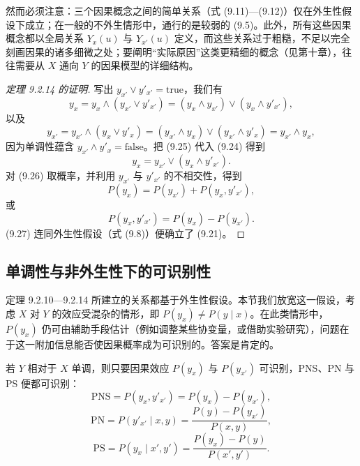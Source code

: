 然而必须注意：三个因果概念之间的简单关系（式 \textup{(9.11)}—\textup{(9.12)}）仅在外生性假设下成立；在一般的不外生情形中，通行的是较弱的 \textup{(9.5)}。此外，所有这些因果概念都以全局关系 $Y_x(u)$ 与 $Y_{x'}(u)$ 定义，而这些关系过于粗糙，不足以完全刻画因果的诸多细微之处；要阐明“实际原因”这类更精细的概念（见第十章），往往需要从 $X$ 通向 $Y$ 的因果模型的详细结构。

\begin{proof}[定理 9.2.14 的证明]
写出 $y_{x'}\vee y'_{x'}=\text{true}$，我们有
\begin{equation}
y_x=y_x\wedge(y_{x'}\vee y'_{x'})=(y_x\wedge y_{x'})\vee(y_x\wedge y'_{x'}), \tag{9.24}
\end{equation}
以及
\begin{equation}
y_{x'}=y_{x'}\wedge(y_x\vee y'_x)=(y_{x'}\wedge y_x)\vee(y_{x'}\wedge y'_x)=y_{x'}\wedge y_x, \tag{9.25}
\end{equation}
因为单调性蕴含 $y_{x'}\wedge y'_x=\text{false}$。把 \textup{(9.25)} 代入 \textup{(9.24)} 得到
\begin{equation}
y_x=y_{x'}\vee(y_x\wedge y'_{x'}). \tag{9.26}
\end{equation}
对 \textup{(9.26)} 取概率，并利用 $y_{x'}$ 与 $y'_{x'}$ 的不相交性，得到
\[
P(y_x)=P(y_{x'})+P(y_x,y'_{x'}),
\]
或
\begin{equation}
P(y_x,y'_{x'})=P(y_x)-P(y_{x'}). \tag{9.27}
\end{equation}
\textup{(9.27)} 连同外生性假设（式 \textup{(9.8)}）便确立了 \textup{(9.21)}。
\end{proof}

\subsection{单调性与非外生性下的可识别性}

定理 9.2.10—9.2.14 所建立的关系都基于外生性假设。本节我们放宽这一假设，考虑 $X$ 对 $Y$ 的效应受混杂的情形，即 $P(y_x)\ne P(y\mid x)$。在此类情形中，$P(y_x)$ 仍可由辅助手段估计（例如调整某些协变量，或借助实验研究），问题在于这一附加信息能否使因果概率成为可识别的。答案是肯定的。

\begin{theorem}
若 $Y$ 相对于 $X$ 单调，则只要因果效应 $P(y_x)$ 与 $P(y_{x'})$ 可识别，PNS、PN 与 PS 便都可识别：
\begin{equation}
\mathrm{PNS}=P(y_x,y'_{x'})=P(y_x)-P(y_{x'}), \tag{9.28}
\end{equation}
\begin{equation}
\mathrm{PN}=P(y'_{x'}\mid x,y)=\frac{P(y)-P(y_{x'})}{P(x,y)}, \tag{9.29}
\end{equation}
\begin{equation}
\mathrm{PS}=P(y_x\mid x',y')=\frac{P(y_x)-P(y)}{P(x',y')}. \tag{9.30}
\end{equation}
\end{theorem}

